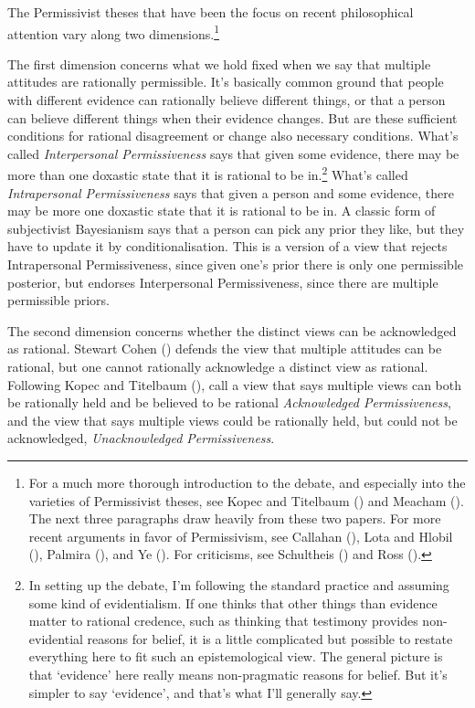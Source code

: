 \documentclass[
  10pt,
  letterpaper,
  DIV=11,
  numbers=noendperiod,
  twoside]{scrartcl}
\begin{document}
The Permissivist theses that have been the focus on recent philosophical
attention vary along two dimensions.\footnote{For a much more thorough
  introduction to the debate, and especially into the varieties of
  Permissivist theses, see Kopec and Titelbaum
  () and Meacham
  (). The next three paragraphs draw
  heavily from these two papers. For more recent arguments in favor of
  Permissivism, see Callahan (), Lota
  and Hlobil (), Palmira
  (), and Ye
  (). For criticisms, see Schultheis
  () and Ross
  ().}

The first dimension concerns what we hold fixed when we say that
multiple attitudes are rationally permissible. It's basically common
ground that people with different evidence can rationally believe
different things, or that a person can believe different things when
their evidence changes. But are these sufficient conditions for rational
disagreement or change also necessary conditions. What's called
\emph{Interpersonal Permissiveness} says that given some evidence, there
may be more than one doxastic state that it is rational to be
in.\footnote{In setting up the debate, I'm following the standard
  practice and assuming some kind of evidentialism. If one thinks that
  other things than evidence matter to rational credence, such as
  thinking that testimony provides non-evidential reasons for belief, it
  is a little complicated but possible to restate everything here to fit
  such an epistemological view. The general picture is that `evidence'
  here really means non-pragmatic reasons for belief. But it's simpler
  to say `evidence', and that's what I'll generally say.} What's called
\emph{Intrapersonal Permissiveness} says that given a person and some
evidence, there may be more one doxastic state that it is rational to be
in. A classic form of subjectivist Bayesianism says that a person can
pick any prior they like, but they have to update it by
conditionalisation. This is a version of a view that rejects
Intrapersonal Permissiveness, since given one's prior there is only one
permissible posterior, but endorses Interpersonal Permissiveness, since
there are multiple permissible priors.

The second dimension concerns whether the distinct views can be
acknowledged as rational. Stewart Cohen ()
defends the view that multiple attitudes can be rational, but one cannot
rationally acknowledge a distinct view as rational. Following Kopec and
Titelbaum (), call a view that
says multiple views can both be rationally held and be believed to be
rational \emph{Acknowledged Permissiveness}, and the view that says
multiple views could be rationally held, but could not be acknowledged,
\emph{Unacknowledged Permissiveness}.
\end{document}
